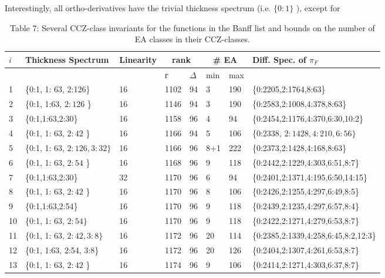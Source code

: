 \documentclass[10pt]{article}
\begin{document}
Interestingly, all ortho-derivatives have the trivial thickness spectrum (i.e. $\{0: 1\}$ ), except for

\begin{table}[h]
\begin{center}
\begin{tabular}{|l|l|l|l|l|l|l|l|}
\hline
\multirow[t]{2}{*}{$i$} & \multirow{2}{*}{Thickness Spectrum} & \multirow{2}{*}{Linearity} & \multicolumn{2}{|c|}{rank} & \multicolumn{2}{|c|}{\# EA} & \multirow{2}{*}{Diff. Spec. of $\pi_{F}$} \\
\hline
 &  &  & г & $\Delta$ & min & max &  \\
\hline
1 & \{0:1, 1: 63, 2:126\} & 16 & 1102 & 94 & 3 & 190 & \{0:2205,2:1764,8:63\} \\
\hline
2 & \{0:1, 1:63, $2: 126$ \} & 16 & 1146 & 94 & 3 & 190 & \{0:2583,2:1008,4:378,8:63\} \\
\hline
3 & \{0:1,1:63,2:30\} & 16 & 1158 & 96 & 4 & 94 & \{0:2454,2:1176,4:370,6:30,10:2\} \\
\hline
4 & \{0:1, 1: 63, $2: 42$ \} & 16 & 1166 & 94 & 5 & 106 & \{0:2338, $2: 1428,4: 210,6: 56\}$ \\
\hline
5 & \{0:1, 1: 63, $2: 126,3: 32\}$ & 16 & 1166 & 96 & 8+1 & 222 & \{0:2373,2:1428,4:168,8:63\} \\
\hline
6 & \{0:1, 1: 63, $2: 54$ \} & 16 & 1168 & 96 & 9 & 118 & \{0:2442,2:1229,4:303,6:51,8:7\} \\
\hline
7 & \{0:1,1:63,2:30\} & 32 & 1170 & 96 & 6 & 94 & \{0:2401,2:1371,4:195,6:50,14:15\} \\
\hline
8 & \{0:1, 1: 63, $2: 42$ \} & 16 & 1170 & 96 & 8 & 106 & \{0:2426,2:1255,4:297,6:49,8:5\} \\
\hline
9 & \{0:1,1:63,2:54\} & 16 & 1170 & 96 & 9 & 118 & \{0:2439,2:1235,4:297,6:57,8:4\} \\
\hline
10 & \{0:1, 1: 63, $2: 54\}$ & 16 & 1170 & 96 & 9 & 118 & \{0:2422,2:1271,4:279,6:53,8:7\} \\
\hline
11 & \{0:1, 1: 63, $2: 42,3: 8\}$ & 16 & 1172 & 96 & 20 & 114 & \{0:2385,2:1339,4:258,6:45,8:2,12:3\} \\
\hline
12 & \{0:1, 1:63, 2:54, 3:8\} & 16 & 1172 & 96 & 20 & 126 & \{0:2404,2:1307,4:261,6:53,8:7\} \\
\hline
13 & \{0:1, 1: 63, $2: 42$ \} & 16 & 1174 & 96 & 9 & 106 & \{0:2414,2:1271,4:303,6:37,8:7\} \\
\hline
\end{tabular}
\captionsetup{labelformat=empty}
\caption{Table 7: Several CCZ-class invariants for the functions in the Banff list and bounds on the number of EA classes in their CCZ-classes.}
\end{center}
\end{table}
\end{document}

